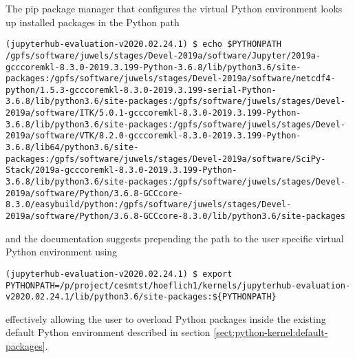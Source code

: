 The pip package manager that configures the virtual Python environment looks up installed packages in the Python path
%
\begin{verbatim}
(jupyterhub-evaluation-v2020.02.24.1) $ echo $PYTHONPATH
/gpfs/software/juwels/stages/Devel-2019a/software/Jupyter/2019a-gcccoremkl-8.3.0-2019.3.199-Python-3.6.8/lib/python3.6/site-packages:/gpfs/software/juwels/stages/Devel-2019a/software/netcdf4-python/1.5.3-gcccoremkl-8.3.0-2019.3.199-serial-Python-3.6.8/lib/python3.6/site-packages:/gpfs/software/juwels/stages/Devel-2019a/software/ITK/5.0.1-gcccoremkl-8.3.0-2019.3.199-Python-3.6.8/lib/python3.6/site-packages:/gpfs/software/juwels/stages/Devel-2019a/software/VTK/8.2.0-gcccoremkl-8.3.0-2019.3.199-Python-3.6.8/lib64/python3.6/site-packages:/gpfs/software/juwels/stages/Devel-2019a/software/SciPy-Stack/2019a-gcccoremkl-8.3.0-2019.3.199-Python-3.6.8/lib/python3.6/site-packages:/gpfs/software/juwels/stages/Devel-2019a/software/Python/3.6.8-GCCcore-8.3.0/easybuild/python:/gpfs/software/juwels/stages/Devel-2019a/software/Python/3.6.8-GCCcore-8.3.0/lib/python3.6/site-packages
\end{verbatim}
%
and the documentation suggests prepending the path to the user specific virtual Python environment using
%
\begin{verbatim}
(jupyterhub-evaluation-v2020.02.24.1) $ export PYTHONPATH=/p/project/cesmtst/hoeflich1/kernels/jupyterhub-evaluation-v2020.02.24.1/lib/python3.6/site-packages:${PYTHONPATH}
\end{verbatim}
%
effectively allowing the user to overload Python packages inside the existing default Python environment described in section \ref{sect:python-kernel:default-packages}.

